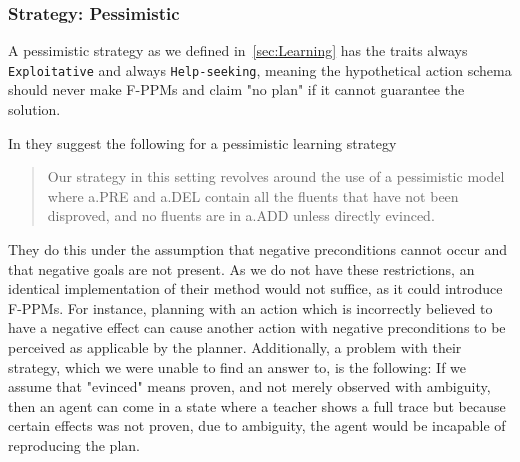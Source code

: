 \documentclass[../Master.tex]{subfiles}
\begin{document}
\subsubsection{Strategy: Pessimistic}

	A pessimistic strategy as we defined in~\ref{sec:Learning} has the traits always \texttt{Exploitative} and always \texttt{Help-seeking},
	meaning the hypothetical action schema should never make F-PPMs and claim "no plan" if it cannot guarantee the solution.

	In \cite{Walsh2008} they suggest the following for a pessimistic learning strategy
	
	\begin{quotation}
		Our strategy in
		this setting revolves around the use of a pessimistic model
		where a.PRE and a.DEL contain all the fluents that have
		not been disproved, and no fluents are in a.ADD unless directly
		evinced.
	\end{quotation}
	 
	They do this under the assumption that negative preconditions cannot occur and that negative goals are not present. As we do not have these restrictions, an identical implementation of their method would not suffice, as it could introduce F-PPMs. For instance, planning with an action which is incorrectly believed to have a negative effect can cause another action with negative preconditions to be perceived as applicable by the planner.
	Additionally, a problem with their strategy, which we were unable to find an answer to, is the following: If we assume that "evinced" means proven, and not merely observed with ambiguity, then an agent can come in a state where a teacher shows a full trace but because certain effects was not proven, due to ambiguity, the agent would be incapable of reproducing the plan.
	
\end{document}
